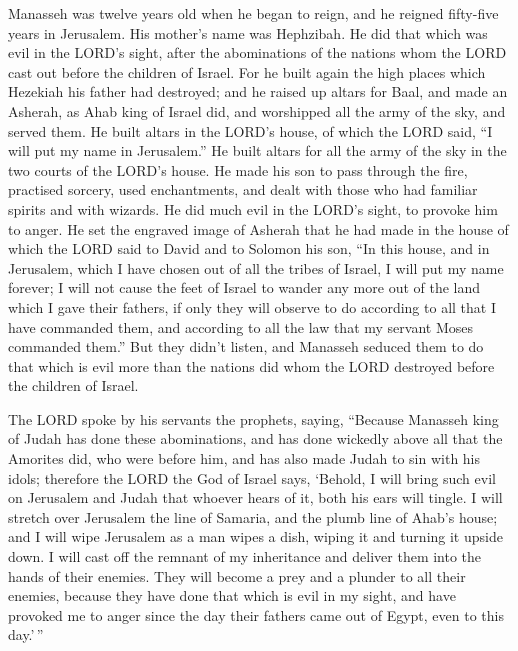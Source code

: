  Manasseh was twelve years old when he began to reign, and
he reigned fifty-five years in Jerusalem. His mother's name was
Hephzibah.  He did that which was evil in the LORD's sight,
after the abominations of the nations whom the LORD cast out before the
children of Israel.  For he built again the high places
which Hezekiah his father had destroyed; and he raised up altars for
Baal, and made an Asherah, as Ahab king of Israel did, and worshipped
all the army of the sky, and served them.  He built altars
in the LORD's house, of which the LORD said, ``I will put my name in
Jerusalem.''  He built altars for all the army of the sky in
the two courts of the LORD's house.  He made his son to pass
through the fire, practised sorcery, used enchantments, and dealt with
those who had familiar spirits and with wizards. He did much evil in the
LORD's sight, to provoke him to anger.  He set the engraved
image of Asherah that he had made in the house of which the LORD said to
David and to Solomon his son, ``In this house, and in Jerusalem, which I
have chosen out of all the tribes of Israel, I will put my name forever;
 I will not cause the feet of Israel to wander any more out
of the land which I gave their fathers, if only they will observe to do
according to all that I have commanded them, and according to all the
law that my servant Moses commanded them.''  But they didn't
listen, and Manasseh seduced them to do that which is evil more than the
nations did whom the LORD destroyed before the children of Israel.

 The LORD spoke by his servants the prophets, saying,
 ``Because Manasseh king of Judah has done these
abominations, and has done wickedly above all that the Amorites did, who
were before him, and has also made Judah to sin with his idols;
 therefore the LORD the God of Israel says, `Behold, I will
bring such evil on Jerusalem and Judah that whoever hears of it, both
his ears will tingle.  I will stretch over Jerusalem the
line of Samaria, and the plumb line of Ahab's house; and I will wipe
Jerusalem as a man wipes a dish, wiping it and turning it upside down.
 I will cast off the remnant of my inheritance and deliver
them into the hands of their enemies. They will become a prey and a
plunder to all their enemies,  because they have done that
which is evil in my sight, and have provoked me to anger since the day
their fathers came out of Egypt, even to this day.'\,''

